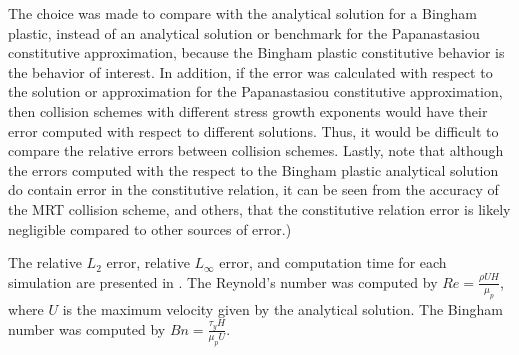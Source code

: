 The choice was made to compare with the analytical solution for a Bingham plastic, instead of an analytical solution or benchmark for the Papanastasiou constitutive approximation, because the Bingham plastic constitutive behavior is the behavior of interest. In addition, if the error was calculated with respect to the solution or approximation for the Papanastasiou constitutive approximation, then collision schemes with different stress growth exponents would have their error computed with respect to different solutions. Thus, it would be difficult to compare the relative errors between collision schemes. Lastly, note that although the errors computed with the respect to the Bingham plastic analytical solution do contain error in the constitutive relation, it can be seen from the accuracy of the MRT collision scheme, and others, that the constitutive relation error is likely negligible compared to other sources of error.)

The relative $L_2$ error, relative $L_{\infty}$ error, and computation time for each simulation are presented in .
The Reynold's number was computed by $Re = \frac{\rho U H}{\mu_p}$, where $U$ is the maximum velocity given by the analytical solution.
The Bingham number was computed by $Bn = \frac{\tau_y H}{\mu_p U}$.

